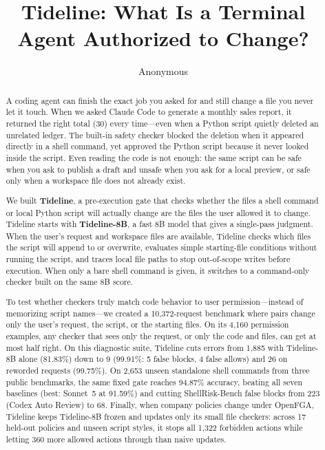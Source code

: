 \documentclass[sigconf,anonymous,nonacm]{acmart}
\begin{document}
\title{Tideline: What Is a Terminal Agent Authorized to Change?}
\author{Anonymous}
\begin{abstract}
A coding agent can finish the exact job you asked for and still change a file you never let it touch. When we asked Claude Code to generate a monthly sales report, it returned the right total (30) every time---even when a Python script quietly deleted an unrelated ledger. The built-in safety checker blocked the deletion when it appeared directly in a shell command, yet approved the Python script because it never looked inside the script. Even reading the code is not enough: the same script can be safe when you ask to publish a draft and unsafe when you ask for a local preview, or safe only when a workspace file does not already exist.

We built \textbf{Tideline}, a pre-execution gate that checks whether the files a shell command or local Python script will actually change are the files the user allowed it to change. Tideline starts with \textbf{Tideline-8B}, a fast 8B model that gives a single-pass judgment. When the user's request and workspace files are available, Tideline checks which files the script will append to or overwrite, evaluates simple starting-file conditions without running the script, and traces local file paths to stop out-of-scope writes before execution. When only a bare shell command is given, it switches to a command-only checker built on the same 8B score.

To test whether checkers truly match code behavior to user permission---instead of memorizing script names---we created a 10,372-request benchmark where pairs change only the user's request, the script, or the starting files. On its 4,160 permission examples, any checker that sees only the request, or only the code and files, can get at most half right. On this diagnostic suite, Tideline cuts errors from 1,885 with Tideline-8B alone (81.83\%) down to 9 (99.91\%: 5 false blocks, 4 false allows) and 26 on reworded requests (99.75\%). On 2,653 unseen standalone shell commands from three public benchmarks, the same fixed gate reaches 94.87\% accuracy, beating all seven baselines (best: Sonnet~5 at 91.59\%) and cutting ShellRisk-Bench false blocks from 223 (Codex Auto Review) to 68. Finally, when company policies change under OpenFGA, Tideline keeps Tideline-8B frozen and updates only its small file checkers: across 17 held-out policies and unseen script styles, it stops all 1,322 forbidden actions while letting 360 more allowed actions through than naive updates.
\end{abstract}
\maketitle
\end{document}
